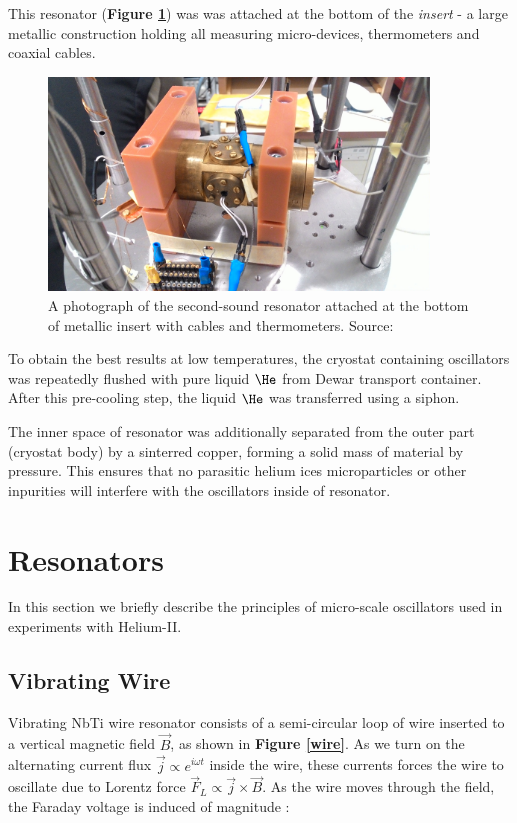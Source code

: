 This resonator (\textbf{Figure \ref{resonator}}) was  was attached at the bottom  of the \textit{insert} - a large metallic construction holding all measuring micro-devices, thermometers and coaxial cables.

\begin{figure}[h]
	\centering
	\includegraphics[width=0.9\textwidth]{graphics/exp/chamber}
	\caption{A photograph of the second-sound resonator attached at the bottom of metallic insert with cables and thermometers. Source: \cite{bakalaris}}
	\label{resonator}
\end{figure}

To obtain the best results at low temperatures, the cryostat containing oscillators was repeatedly flushed with pure liquid $\He$ from Dewar transport container. After this pre-cooling step, the liquid $\He$ was transferred using a siphon.

The inner space of resonator was additionally separated from the outer part (cryostat body) by a sinterred copper, forming a solid mass of material by pressure. This ensures that no parasitic helium ices microparticles or other inpurities will interfere with the oscillators inside of resonator.


\newpage

\section{Resonators}

In this section we briefly describe the principles of micro-scale oscillators used in experiments with Helium-II.

\subsection{Vibrating Wire}

Vibrating NbTi wire resonator consists of a semi-circular loop of wire inserted to a vertical magnetic field $\vec{B}$, as shown in \textbf{Figure \ref{wire}}. As we turn on the alternating current flux $\vec{j} \propto e^{i\omega t}$ inside the wire, these currents forces the wire to oscillate due to Lorentz force $\vec{F}_L \propto \vec{j} \times \vec{B} $. As the wire moves through the field, the Faraday voltage is induced of magnitude \cite{wire}:


